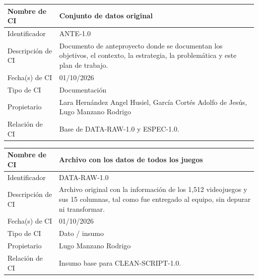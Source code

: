 \documentclass[letterpaper,11pt]{article}
\begin{document}
\bigskip
\noindent\begin{minipage}{\textwidth}
\small\renewcommand{\arraystretch}{1.9}
\begin{tabularx}{\textwidth}{|p{3.3cm}|Y|}
\hline
Nombre de CI & Conjunto de datos original \\ \hline
Identificador & ANTE-1.0 \\ \hline
Descripción de CI & Documento de anteproyecto donde se documentan los objetivos, el contexto, la estrategia, la problemática y este plan de trabajo. \\ \hline
Fecha(s) de CI & 01/10/2026 \\ \hline
Tipo de CI & Documentación \\ \hline
Propietario & Lara Hernández Angel Husiel, García Cortés Adolfo de Jesús, Lugo Manzano Rodrigo \\ \hline
Relación de CI & Base de DATA-RAW-1.0 y ESPEC-1.0. \\ \hline
\end{tabularx}
\end{minipage}\par\bigskip
\noindent\begin{minipage}{\textwidth}
\small\renewcommand{\arraystretch}{1.9}
\begin{tabularx}{\textwidth}{|p{3.3cm}|Y|}
\hline
Nombre de CI & Archivo con los datos de todos los juegos \\ \hline
Identificador & DATA-RAW-1.0 \\ \hline
Descripción de CI & Archivo original con la información de los 1,512 videojuegos y sus 15 columnas, tal como fue entregado al equipo, sin depurar ni transformar. \\ \hline
Fecha(s) de CI & 01/10/2026 \\ \hline
Tipo de CI & Dato / insumo \\ \hline
Propietario & Lugo Manzano Rodrigo \\ \hline
Relación de CI & Insumo base para CLEAN-SCRIPT-1.0. \\ \hline
\end{tabularx}
\end{minipage}\par\bigskip
\end{document}
